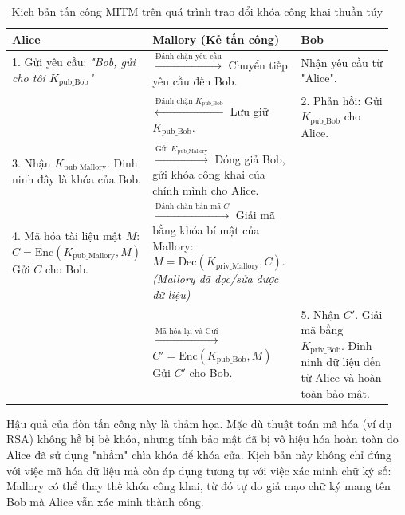\begin{table}[htbp]
    \centering
    \caption{Kịch bản tấn công MITM trên quá trình trao đổi khóa công khai thuần túy}
    \label{tab:mitm}
    \renewcommand{\arraystretch}{1.5}
    \begin{tabular}{|p{0.25\linewidth}|p{0.4\linewidth}|p{0.3\linewidth}|}
        \hline
        \rowcolor{gray!20}
        \textbf{Alice} & \textbf{Mallory (Kẻ tấn công)} & \textbf{Bob} \\ \hline
        1. Gửi yêu cầu: \textit{"Bob, gửi cho tôi $K_{\mathrm{pub\_Bob}}$"} & $\xrightarrow{\text{Đánh chặn yêu cầu}}$ \newline Chuyển tiếp yêu cầu đến Bob. & Nhận yêu cầu từ "Alice". \\ \hline
        & $\xleftarrow{\text{Đánh chặn } K_{\mathrm{pub\_Bob}}}$ \newline Lưu giữ $K_{\mathrm{pub\_Bob}}$. & 2. Phản hồi: Gửi $K_{\mathrm{pub\_Bob}}$ cho Alice. \\ \hline
        3. Nhận $K_{\mathrm{pub\_Mallory}}$. Đinh ninh đây là khóa của Bob. & $\xrightarrow{\text{Gửi } K_{\mathrm{pub\_Mallory}}}$ \newline Đóng giả Bob, gửi khóa công khai của chính mình cho Alice. & \\ \hline
        4. Mã hóa tài liệu mật $M$: \newline $C = \mathrm{Enc}(K_{\mathrm{pub\_Mallory}}, M)$ \newline Gửi $C$ cho Bob. & $\xrightarrow{\text{Đánh chặn bản mã } C}$ \newline Giải mã bằng khóa bí mật của Mallory: $M = \mathrm{Dec}(K_{\mathrm{priv\_Mallory}}, C)$. \newline \textit{(Mallory đã đọc/sửa được dữ liệu)} & \\ \hline
        & $\xrightarrow{\text{Mã hóa lại và Gửi}}$ \newline $C' = \mathrm{Enc}(K_{\mathrm{pub\_Bob}}, M)$ \newline Gửi $C'$ cho Bob. & 5. Nhận $C'$. \newline Giải mã bằng $K_{\mathrm{priv\_Bob}}$. \newline Đinh ninh dữ liệu đến từ Alice và hoàn toàn bảo mật. \\ \hline
    \end{tabular}
\end{table}

Hậu quả của đòn tấn công này là thảm họa. Mặc dù thuật toán mã hóa (ví dụ RSA) không hề bị bẻ khóa, nhưng tính bảo mật đã bị vô hiệu hóa hoàn toàn do Alice đã sử dụng "nhầm" chìa khóa để khóa cửa. Kịch bản này không chỉ đúng với việc mã hóa dữ liệu mà còn áp dụng tương tự với việc xác minh chữ ký số: Mallory có thể thay thế khóa công khai, từ đó tự do giả mạo chữ ký mang tên Bob mà Alice vẫn xác minh thành công.

